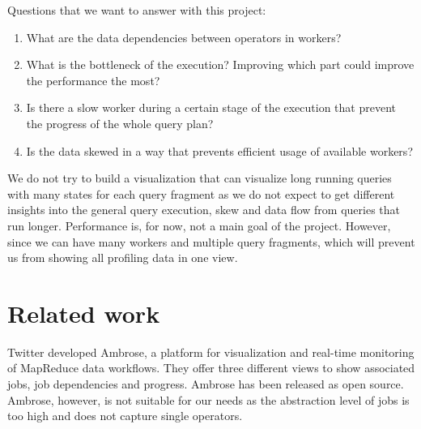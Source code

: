 \documentclass[11pt]{scrartcl}
\begin{document}
\noindent Questions that we want to answer with this project:

\begin{enumerate}
  \item What are the data dependencies between operators in workers?
  \item What is the bottleneck of the execution? Improving which part could improve the performance the most?
  \item Is there a slow worker during a certain stage of the execution that prevent the progress of the whole query plan?
  \item Is the data skewed in a way that prevents efficient usage of available workers?

\end{enumerate}

We do not try to build a visualization that can visualize long running queries with many states for each query fragment as we do not expect to get different insights into the general query execution, skew and data flow from queries that run longer. Performance is, for now, not a main goal of the project. However, since we can have many workers and multiple query fragments, which will prevent us from showing all profiling data in one view.


\section{Related work}

Twitter developed Ambrose\cite{ambrose}, a platform for visualization and real-time monitoring of MapReduce data workflows. They offer three different views to show associated jobs, job dependencies and progress. Ambrose has been released as open source. Ambrose, however, is not suitable for our needs as the abstraction level of jobs is too high and does not capture single operators.
\end{document}
